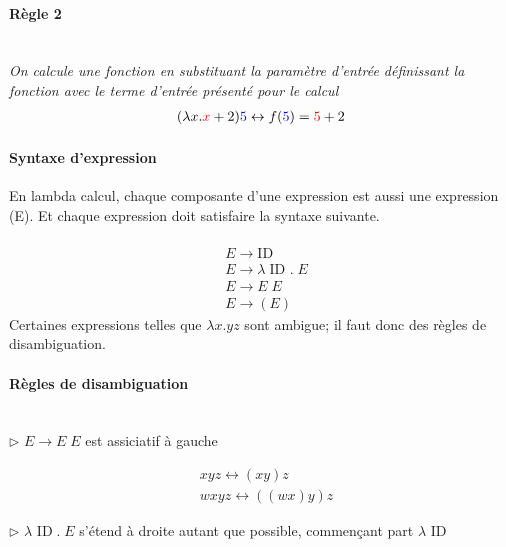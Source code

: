 \documentclass{report}
\begin{document}
\begin{multicols*}{3}
    \paragraph{Règle 2}
    \mbox{}\\
    \textit{On calcule une fonction en substituant la paramètre d'entrée 
    définissant la fonction avec le terme d'entrée présenté pour le calcul}
    \begin{align*}
         (\lambda x.\textcolor{red}{x}  +2)\textcolor{blue}{5}   
          \leftrightarrow f(\textcolor{blue}{5}  ) = \textcolor{red}{5} + 2  
    \end{align*}

    \paragraph{Syntaxe d'expression}
    En lambda calcul, chaque composante d'une expression est 
    aussi une expression (E). Et chaque expression doit satisfaire 
    la syntaxe suivante. 
    \mbox{} \\\\
    \begin{align*}
      & E \rightarrow \text{ID} \\
      & E \rightarrow \lambda \; \text{ID } . \; E \\ 
      & E \rightarrow E \; E \\
      & E \rightarrow (E) 
    \end{align*}
    Certaines expressions telles que $\lambda x. y z$ sont ambigue; 
    il faut donc des règles de disambiguation. 

    \paragraph{Règles de disambiguation} \mbox{}\\ 
    $\rhd$ $E \rightarrow E \; E$ est assiciatif à gauche

    \begin{align*}
        & x y z \leftrightarrow (x y)z \\ 
        & w x y z \leftrightarrow ((w x) y) z
    \end{align*}

    \noindent
    $\rhd$ $\lambda \text{ ID} \; . \; E$ s'étend à droite autant 
    que possible, commençant part $\lambda \text{ ID}$


\end{multicols*}
\end{document}
